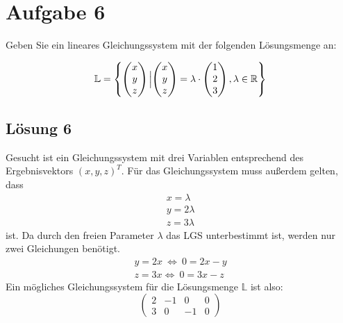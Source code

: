 \section{Aufgabe 6}

Geben Sie ein lineares Gleichungssystem mit der folgenden Lösungsmenge an:

\begin{equation*}
	\mathbb{L} =\left\{\begin{pmatrix}
		x\\
		y\\
		z
	\end{pmatrix}\Bigl|\begin{pmatrix}
		x\\
		y\\
		z
	\end{pmatrix} =\lambda \cdot \begin{pmatrix}
		1\\
		2\\
		3
	\end{pmatrix} ,\lambda \in \mathbb{R}\right\}
\end{equation*}

\subsection{Lösung 6}

Gesucht ist ein Gleichungssystem mit drei Variablen entsprechend des Ergebnisvektors $\displaystyle ( x,y,z)^{T}$. Für das Gleichungssystem muss außerdem gelten, dass
\begin{gather*}
	x=\lambda \\
	y=2\lambda \\
	z=3\lambda 
\end{gather*}
ist. Da durch den freien Parameter $\displaystyle \lambda $ das LGS unterbestimmt ist, werden nur zwei Gleichungen benötigt.
\begin{gather*}
	y=2x\ \Leftrightarrow \ 0=2x-y\\
	z=3x\Leftrightarrow \ 0=3x-z
\end{gather*}
Ein mögliches Gleichungssystem für die Lösungsmenge $\displaystyle \mathbb{L}$ ist also:
\begin{equation*}
	\begin{pmatrix}
		2 & -1 & 0 & 0\\
		3 & 0 & -1 & 0
	\end{pmatrix}
\end{equation*}